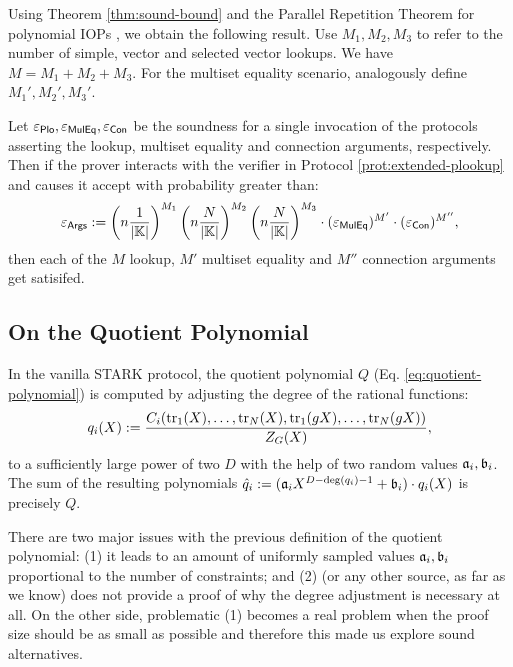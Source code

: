 Using Theorem \ref{thm:sound-bound} and the Parallel Repetition Theorem for polynomial IOPs \cite{EPRINT:BenChiSpo16}, \cite{Goldreich98} we obtain the following result. Use $M_1,M_2,M_3$ to refer to the number of simple, vector and selected vector lookups. We have $M = M_1+M_2+M_3$. For the multiset equality scenario, analogously define $M_1',M_2',M_3'$.
\begin{corollary}
  Let $\varepsilon_{\textsf{Plo}},\varepsilon_{\textsf{MulEq}},\varepsilon_{\textsf{Con}}$ be the soundness for a single invocation of the protocols asserting the lookup, multiset equality and connection arguments, respectively. Then if the prover interacts with the verifier in Protocol \ref{prot:extended-plookup} and causes it accept with probability greater than:
  \[
  \varepsilon_{\textsf{Args}} := \left(n\frac{1}{|\mathbb{K}|}\right)^{M_1}\left(n\frac{N}{|\mathbb{K}|}\right)^{M_2}\left(n\frac{N}{|\mathbb{K}|}\right)^{M_3} \cdot (\varepsilon_{\textsf{MulEq}})^{M'} \cdot (\varepsilon_{\textsf{Con}})^{M''},
  \]
  then each of the $M$ lookup, $M'$ multiset equality and $M''$ connection arguments get satisifed.
\end{corollary}







\subsection{On the Quotient Polynomial}\label{sec:quotient-polynomial}

In the vanilla STARK protocol, the quotient polynomial $Q$ (Eq. \ref{eq:quotient-polynomial}) is computed by adjusting the degree of the rational functions:
\[
  q_i(X) := \frac{C_i(\text{tr}_1(X), \dots, \text{tr}_N(X), \text{tr}_1(gX), \dots, \text{tr}_N(gX))}{Z_{G}(X)},
\]
to a sufficiently large power of two $D$ with the help of two random values $\mathfrak{a}_i,\mathfrak{b}_i$. The sum of the resulting polynomials $\hat{q}_i := (\mathfrak{a}_iX^{D-\deg(q_i)-1} + \mathfrak{b}_i) \cdot q_i(X)$ is precisely $Q$. 

There are two major issues with the previous definition of the quotient polynomial: (1) it leads to an amount of uniformly sampled values $\mathfrak{a}_i,\mathfrak{b}_i$ proportional to the number of constraints; and (2) \cite{EPRINT:StarkWare21} (or any other source, as far as we know) does not provide a proof of why the degree adjustment is necessary at all. On the other side, problematic (1) becomes a real problem when the proof size should be as small as possible and therefore this made us explore sound alternatives.

